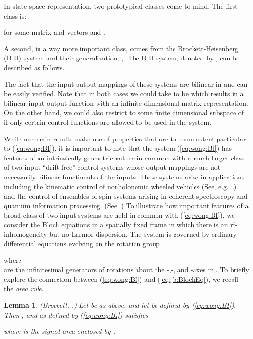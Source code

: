 \documentclass[12pt,onecolumn,draftcls]{IEEEtran}
\newtheorem{lemma}{Lemma}[section]
\begin{document}
In state-space representation, two prototypical classes come to mind.  The first class is:


for some matrix  and vectors  and .

A second, in a way more important class, comes from the Brockett-Heisenberg (B-H) system and their generalization, \cite{rwb1},\cite{rwb2}.  The B-H system, denoted by ,
can be described as follows. 


The fact that the input-output mappings of these systems are bilinear in  and  can be easily verified.  Note that in both cases we could take
 to be  which results in a bilinear
input-output function with an infinite dimensional matrix representation.
On the other hand, we could also restrict
 to some finite dimensional subspace of  if
only certain control functions are allowed to be used in the system.






While our main results make use 
of properties that are to some extent particular to (\ref{eq:wong:BI}), it is important to note that the system (\ref{eq:wong:BI}) has features of
an intrinsically geometric nature in common with a much larger class of two-input ``drift-free'' control systems whose output mappings are not necessarily bilinear functionals of the inputs.  These systems arise in applications including the kinematic control of nonholonomic wheeled vehicles (See, e.g.\ \cite{LeonardKrishna}.) and the control of ensembles of spin systems arising in coherent spectroscopy and quantum information processing. (See \cite{LiKhan2}.) 
To illustrate how important features of a broad class of two-input systems are held in common with (\ref{eq:wong:BI}), we consider the Bloch equations in a spatially fixed frame in which there is an rf-inhomogeneity but no Larmor dispersion.  The system is governed by ordinary
differential equations evolving on the rotation group .

where
\\

are the infinitesimal generators of rotations about the -,-, and -axes in .  
To briefly explore the connection between (\ref{eq:wong:BI}) and (\ref{eq:jb:BlochEq}), we recall the {\em area rule}.

\medskip
\begin{lemma} {\rm (Brockett, \cite{rwb3}.)} Let  be as above, and let  be defined by (\ref{eq:wong:BI}).  Then , and  as defined by (\ref{eq:wong:BI}) satisfies 

where  is the signed area enclosed by .
\label{thm:jb:Area}
\end{lemma}
\end{document}

